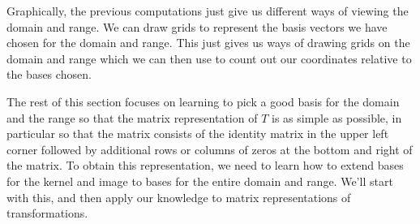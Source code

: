 Graphically, the previous computations just give us different ways of viewing the domain and range. We can draw grids to represent the basis vectors we have chosen for the domain and range. This just gives us ways of drawing grids on the domain and range which we can then use to count out our coordinates relative to the bases chosen. 

The rest of this section focuses on learning to pick a good basis for the domain and the range so that the matrix representation of $T$ is as simple as possible, in particular so that the matrix consists of the identity matrix in the upper left corner followed by additional rows or columns of zeros at the bottom and right of the matrix. To obtain this representation, we need to learn how to extend bases for the kernel and image to bases for the entire domain and range.  We'll start with this, and then apply our knowledge to matrix representations of transformations.







